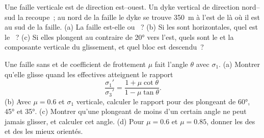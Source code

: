\begin{exercise}[$\star\star$]\label{exo:b1:faults-folds-fabrics:9}
Une faille verticale est de direction est--ouest. Un dyke vertical de direction nord--sud
la recoupe~; au nord de la faille le dyke se trouve \qty{350}{m} à l'est de là où
il est au sud de la faille. (a) La faille est-elle  ou ~? (b) Si les
 sont horizontales, quel est le ~? (c) Si elles plongent au contraire de
\ang{20} vers l'est, quels sont le  et la composante verticale du
glissement, et quel bloc est descendu~?
\end{exercise}

\begin{exercise}[$\star\star\star$]\label{exo:b1:faults-folds-fabrics:10}
Une faille sans  et de coefficient de frottement $\mu$ fait l'angle
$\theta$ avec $\sigma_1$. (a) Montrer qu'elle glisse quand les  effectives
atteignent le rapport
\[
  \frac{\sigma_1'}{\sigma_3'} = \frac{1 + \mu\cot\theta}{1 - \mu\tan\theta} .
\]
(b) Avec $\mu = 0.6$ et $\sigma_1$ verticale, calculer le rapport pour des 
plongeant de \ang{60}, \ang{45} et \ang{35}. (c) Montrer qu'une 
plongeant de moins d'un certain angle ne peut jamais glisser, et calculer cet angle.
(d) Pour $\mu = 0.6$ et $\mu = 0.85$, donner les  des  et
des  les mieux orientés.
\end{exercise}

